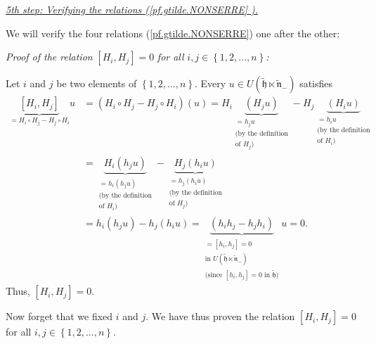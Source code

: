 \documentclass[etingof-lie.tex]{subfiles}
\begin{document}
\bigskip

\underline{\textit{5th step: Verifying the relations (\ref{pf.gtilde.NONSERRE}%
).}}

We will verify the four relations (\ref{pf.gtilde.NONSERRE}) one after the other:

\bigskip

\textit{Proof of the relation }$\left[  H_{i},H_{j}\right]  =0$ \textit{for
all } $i,j\in\left\{  1,2,...,n\right\}  $\textit{:}

Let $i$ and $j$ be two elements of $\left\{  1,2,...,n\right\}  $. Every $u\in
U\left(  \widetilde{\mathfrak{h}}\ltimes\widetilde{\mathfrak{n}}_{-}\right)  $
satisfies%
\begin{align*}
\underbrace{\left[  H_{i},H_{j}\right]  }_{=H_{i}\circ H_{j}-H_{j}\circ H_{i}%
}u  &  =\left(  H_{i}\circ H_{j}-H_{j}\circ H_{i}\right)  \left(  u\right)
=H_{i}\underbrace{\left(  H_{j}u\right)  }_{\substack{=h_{j}u\\\text{(by the
definition}\\\text{of }H_{j}\text{)}}}-H_{j}\underbrace{\left(  H_{i}u\right)
}_{\substack{=h_{i}u\\\text{(by the definition}\\\text{of }H_{i}\text{)}}}\\
&  =\underbrace{H_{i}\left(  h_{j}u\right)  }_{\substack{=h_{i}\left(
h_{j}u\right)  \\\text{(by the definition}\\\text{of }H_{i}\text{)}%
}}-\underbrace{H_{j}\left(  h_{i}u\right)  }_{\substack{=h_{j}\left(
h_{i}u\right)  \\\text{(by the definition}\\\text{of }H_{j}\text{)}}}\\
&  =h_{i}\left(  h_{j}u\right)  -h_{j}\left(  h_{i}u\right)
=\underbrace{\left(  h_{i}h_{j}-h_{j}h_{i}\right)  }_{\substack{=\left[
h_{i},h_{j}\right]  =0\\\text{in }U\left(  \widetilde{\mathfrak{h}}%
\ltimes\widetilde{\mathfrak{n}}_{-}\right)  \\\text{(since }\left[
h_{i},h_{j}\right]  =0\text{ in }\widetilde{\mathfrak{h}}\text{)}}}u=0.
\end{align*}
Thus, $\left[  H_{i},H_{j}\right]  =0$.

Now forget that we fixed $i$ and $j$. We have thus proven the relation
$\left[  H_{i},H_{j}\right]  =0$ for all $i,j\in\left\{  1,2,...,n\right\}  $.

\bigskip
\end{document}
